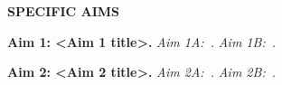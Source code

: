 \documentclass[11pt,letterpaper]{article}
\begin{document}
\enlargethispage{0.4in}
\vspace*{-0.15in}
\textbf{SPECIFIC AIMS}
\vspace{-2pt}

\lipsum[1]

\vspace{2pt}
\lipsum[2]

\lipsum[3]

\textbf{Aim 1: <Aim 1 title>.}
\textit{Aim 1A:\ <Subaim 1A title>.}
\textit{Aim 1B:\ <Subaim 1B title>.}

\textbf{Aim 2: <Aim 2 title>.}
\textit{Aim 2A:\ <Subaim 2A title>.}
\textit{Aim 2B:\ <Subaim 2B title>.}


\textbf{\lipsum[18][1-2]}
\end{document}
